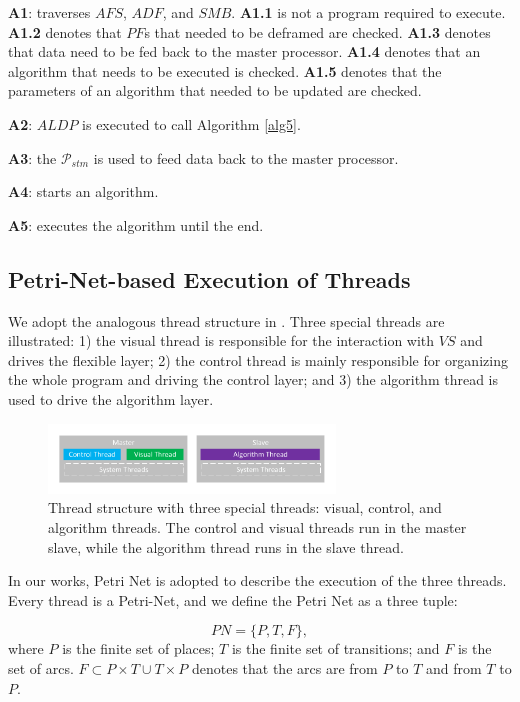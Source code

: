 \documentclass[journal,UTF8]{IEEEtran}
\begin{document}
	\textbf{A1}: traverses $AFS$, $ADF$, and $SMB$. \textbf{A1.1} is not a program required to execute. \textbf{A1.2} denotes that $PF$s that needed to be deframed are checked. \textbf{A1.3} denotes that data need to be fed back to the master processor. \textbf{A1.4} denotes that an algorithm that needs to be executed is checked. \textbf{A1.5} denotes that the parameters of an algorithm that needed to be updated are checked.  
	
	\textbf{A2}: $ALDP$ is executed to call Algorithm \ref{alg5}. 
	
	\textbf{A3}: the $\mathcal{P}_{stm}$ is used to feed data back to the master processor. 
	
	\textbf{A4}: starts an algorithm.
	
	\textbf{A5}: executes the algorithm until the end. 
	
	\subsection{Petri-Net-based Execution of Threads}
	We adopt the analogous thread structure in \cite{wu2018customized}. Three special threads are illustrated: 1) the visual thread is responsible for the interaction with $VS$ and drives the flexible layer; 2) the control thread is mainly responsible for organizing the whole program and driving the control layer; and 3) the algorithm thread is used to drive the algorithm layer.
	
	\begin{figure}
		\centering
		\includegraphics[width=3in]{fig/Threads.pdf}
		\caption{ Thread structure with three special threads: visual, control, and algorithm threads. The control and visual threads run in the master slave, while the algorithm thread runs in the slave thread.}
		\label{fig:Threads}
	\end{figure}
	
	In our works, Petri Net is adopted to describe the execution of the three threads. Every thread is a Petri-Net, and we define the Petri Net as a three tuple:
	
	\begin{equation}
	PN = \{P,T,F\},
	\end{equation} 
	where $P$ is the finite set of places; $T$ is the finite set of transitions; and $F$ is the set of arcs. $F \subset P\times T \cup T\times P$ denotes that the arcs are from $P$ to $T$ and from $T$ to $P$.
	
\end{document}
